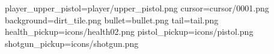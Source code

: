 player_upper_pistol=player/upper_pistol.png
cursor=cursor/0001.png
background=dirt_tile.png
bullet=bullet.png
tail=tail.png
health_pickup=icons/health02.png
pistol_pickup=icons/pistol.png
shotgun_pickup=icons/shotgun.png

